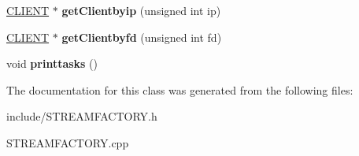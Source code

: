 \begin{DoxyCompactItemize}
\item 
\hypertarget{classSTREAMFACTORY_ac4b55aa4e63f0fdd448b868fd8b64b09}{}\hyperlink{structCLIENT}{C\+L\+I\+E\+N\+T} $\ast$ {\bfseries get\+Clientbyip} (unsigned int ip)\label{classSTREAMFACTORY_ac4b55aa4e63f0fdd448b868fd8b64b09}

\item 
\hypertarget{classSTREAMFACTORY_ad9090e3e710248bdf02df4b12f608f95}{}\hyperlink{structCLIENT}{C\+L\+I\+E\+N\+T} $\ast$ {\bfseries get\+Clientbyfd} (unsigned int fd)\label{classSTREAMFACTORY_ad9090e3e710248bdf02df4b12f608f95}

\item 
\hypertarget{classSTREAMFACTORY_a6f8e47599501134534b0957a8c2cd6dc}{}void {\bfseries printtasks} ()\label{classSTREAMFACTORY_a6f8e47599501134534b0957a8c2cd6dc}

\end{DoxyCompactItemize}


The documentation for this class was generated from the following files\+:\begin{DoxyCompactItemize}
\item 
include/S\+T\+R\+E\+A\+M\+F\+A\+C\+T\+O\+R\+Y.\+h\item 
S\+T\+R\+E\+A\+M\+F\+A\+C\+T\+O\+R\+Y.\+cpp\end{DoxyCompactItemize}
